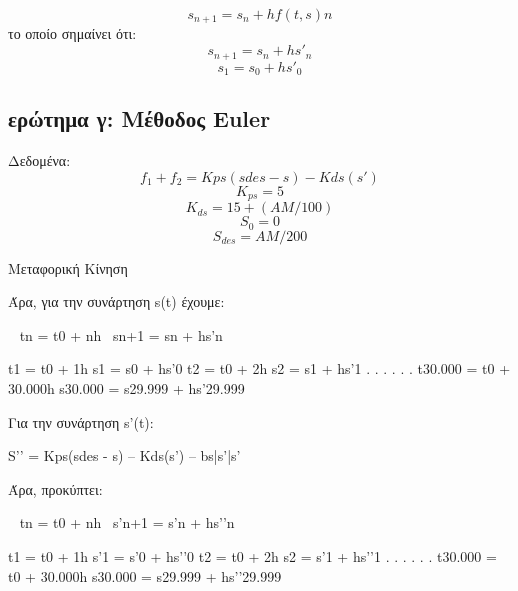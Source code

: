 \documentclass[a4paper]{article}
\begin{document}
        \[s_{n+1}=s_n+hf(t,s)n\]
        το οποίο σημαίνει ότι:
        \[s_{n+1}=s_n+hs'_n\]
        \[s_1=s_0+hs'_0\]
        \subsection{ερώτημα γ: Μέθοδος Euler}

        Δεδομένα:
        \begin{equation}
            f_1 + f_2 = Kps (sdes - s) - Kds (s')
        \end{equation}
        \begin{equation}
            K_{ps} = 5
        \end{equation}
        \begin{equation}
            K_{ds} = 15 + (AM/ 100)
        \end{equation}
        \begin{equation}
            S_0 =0
        \end{equation}
        \begin{equation}
            S_{des} = AM / 200
        \end{equation}
            
        

        Μεταφορική Κίνηση


        Άρα, για την συνάρτηση s(t) έχουμε:

        ~ tn = t0 + nh					~sn+1 = sn  + hs’n

        t1 = t0  + 1h					   s1    = s0  + hs’­­­0
        t2 = t0  + 2h					   s2    = s1  + hs’1
            .						     .
            .						     .
            .						     .
        t30.000 = t0 + 30.000h			    s30.000 = s29.999 + hs’29.999
            
        Για την συνάρτηση s’(t):

            S’’	= Kps(sdes - s) – Kds(s’) – bs|s’|s’

            Άρα, προκύπτει:

        ~ tn = t0 + nh					~s’n+1 = s’n  + hs’’n

        t1 = t0  + 1h					   s’1    = s’0  + hs’’­­­0
        t2 = t0  + 2h					   s2    = s’1  + hs’’1
            .						     .
            .						     .
            .						     .
        t30.000 = t0 + 30.000h			   s30.000 = s29.999 + hs’’29.999
\end{document}
